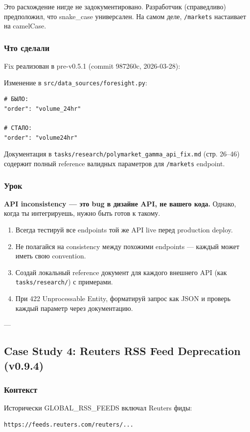 Это расхождение нигде не задокументировано. Разработчик (справедливо) предположил, что snake\_case универсален. На самом деле, \texttt{/markets} настаивает на camelCase.

\subsubsection*{Что сделали}
Fix реализован в pre-v0.5.1 (commit 987260c, 2026-03-28):

Изменение в \texttt{src/data\_sources/foresight.py}:
\begin{verbatim}
# БЫЛО:
"order": "volume_24hr"

# СТАЛО:
"order": "volume24hr"
\end{verbatim}

Документация в \texttt{tasks/research/polymarket\_gamma\_api\_fix.md} (стр. 26--46) содержит полный reference валидных параметров для \texttt{/markets} endpoint.

\subsubsection*{Урок}
\textbf{API inconsistency --- это bug в дизайне API, не вашего кода.} Однако, когда ты интегрируешь, нужно быть готов к такому.

\begin{enumerate}
\item Всегда тестируй все endpoints той же API live перед production deploy.
\item Не полагайся на consistency между похожими endpoints --- каждый может иметь свою convention.
\item Создай локальный reference документ для каждого внешнего API (как \texttt{tasks/research/}) с примерами.
\item При 422 Unprocessable Entity, форматируй запрос как JSON и проверь каждый параметр через документацию.
\end{enumerate}

---

\subsection{Case Study 4: Reuters RSS Feed Deprecation (v0.9.4)}

\subsubsection*{Контекст}
Исторически GLOBAL\_RSS\_FEEDS включал Reuters фиды:
\begin{verbatim}
https://feeds.reuters.com/reuters/...
\end{verbatim}

